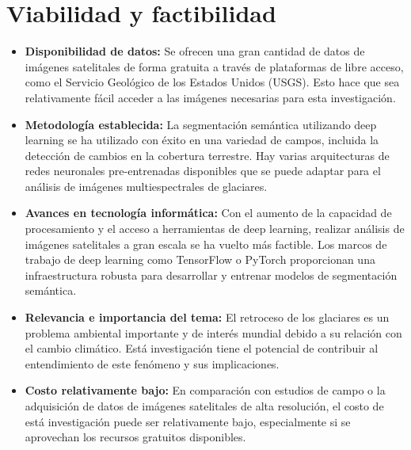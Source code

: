 \section{Viabilidad y factibilidad}
\begin{itemize}
	\item \textbf{Disponibilidad de datos:} Se ofrecen una gran cantidad de datos de imágenes satelitales de forma gratuita a través de plataformas de libre acceso, como el Servicio Geológico de los Estados Unidos (USGS). Esto hace que sea relativamente fácil acceder a las imágenes necesarias para esta investigación.
	
	\item \textbf{Metodología establecida:} La segmentación semántica utilizando deep learning se ha utilizado con éxito en una variedad de campos, incluida la detección de cambios en la cobertura terrestre. Hay varias arquitecturas de redes neuronales pre-entrenadas disponibles que se puede adaptar para el análisis de imágenes multiespectrales de glaciares.
	
	\item \textbf{Avances en tecnología informática:} Con el aumento de la capacidad de procesamiento y el acceso a herramientas de deep learning, realizar análisis de imágenes satelitales a gran escala se ha vuelto más factible. Los marcos de trabajo de deep learning como TensorFlow o PyTorch proporcionan una infraestructura robusta para desarrollar y entrenar modelos de segmentación semántica.
	
	\item \textbf{Relevancia e importancia del tema:} El retroceso de los glaciares es un problema ambiental importante y de interés mundial debido a su relación con el cambio climático. Está investigación tiene el potencial de contribuir al entendimiento de este fenómeno y sus implicaciones.
	
	\item \textbf{Costo relativamente bajo:} En comparación con estudios de campo o la adquisición de datos de imágenes satelitales de alta resolución, el costo de está investigación puede ser relativamente bajo, especialmente si se aprovechan los recursos gratuitos disponibles.
	
\end{itemize}

